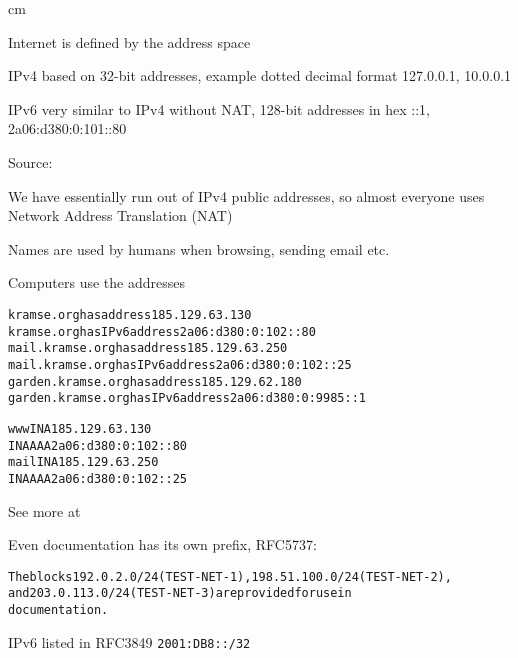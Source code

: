 \documentclass[Screen16to9,17pt]{foils}
\begin{document}

 cm

\begin{list2}
\item Internet is defined by the address space
\item IPv4 based on 32-bit addresses, example dotted decimal format 127.0.0.1, 10.0.0.1
\item IPv6 very similar to IPv4 without NAT, 128-bit addresses in hex ::1, 2a06:d380:0:101::80
\end{list2}



Source: 

We have essentially run out of IPv4 public addresses, so almost everyone uses Network Address Translation (NAT)


Names are used by humans when browsing, sending email etc.



Computers use the addresses
\begin{alltt}
kramse.org has address 185.129.63.130
kramse.org has IPv6 address 2a06:d380:0:102::80
mail.kramse.org has address 185.129.63.250
mail.kramse.org has IPv6 address 2a06:d380:0:102::25
garden.kramse.org has address 185.129.62.180
garden.kramse.org has IPv6 address 2a06:d380:0:9985::1


www     IN      A       185.129.63.130
        IN      AAAA    2a06:d380:0:102::80
mail    IN      A       185.129.63.250
        IN      AAAA    2a06:d380:0:102::25
\end{alltt}


See more at 



Even documentation has its own prefix, RFC5737:
\begin{alltt}
The blocks 192.0.2.0/24 (TEST-NET-1), 198.51.100.0/24 (TEST-NET-2),
and 203.0.113.0/24 (TEST-NET-3) are provided for use in
documentation.
\end{alltt}

IPv6 listed in RFC3849 \verb+2001:DB8::/32+
\end{document}
